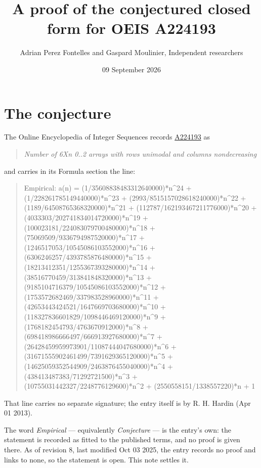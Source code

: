\documentclass[11pt]{article}
\title{A proof of the conjectured closed form for OEIS A224193}
\author{Adrian Perez Fontelles and Gaspard Moulinier, Independent researchers}
\date{09 September 2026}
\theoremstyle{definition}
\begin{document}
\maketitle
\section{The conjecture}

The Online Encyclopedia of Integer Sequences records \href{https://oeis.org/A224193}{A224193} as

\begin{quote}\itshape Number of 6Xn 0..2 arrays with rows unimodal and columns nondecreasing\end{quote}

and carries in its Formula section the line:

\begin{quote}\ttfamily Empirical: a(n) = (1/35608838483312640000)*n\textasciicircum{}24 + (1/228261785149440000)*n\textasciicircum{}23 + (2993/8515157028618240000)*n\textasciicircum{}22 + (1189/64508765368320000)*n\textasciicircum{}21 + (112787/162193467211776000)*n\textasciicircum{}20 + (4033303/202741834014720000)*n\textasciicircum{}19 + (100023181/224083079700480000)*n\textasciicircum{}18 + (75069509/9336794987520000)*n\textasciicircum{}17 + (1246517053/10545086103552000)*n\textasciicircum{}16 + (6306246257/4393785876480000)*n\textasciicircum{}15 + (18213412351/1255367393280000)*n\textasciicircum{}14 + (38516770459/313841848320000)*n\textasciicircum{}13 + (9185104716379/10545086103552000)*n\textasciicircum{}12 + (1753572682469/337983528960000)*n\textasciicircum{}11 + (42653443424521/1647669703680000)*n\textasciicircum{}10 + (118327836601829/1098446469120000)*n\textasciicircum{}9 + (1768182454793/4763670912000)*n\textasciicircum{}8 + (698418986666497/666913927680000)*n\textasciicircum{}7 + (26428459959973901/11087444047680000)*n\textasciicircum{}6 + (31671555902461499/7391629365120000)*n\textasciicircum{}5 + (14625059352544909/2463876455040000)*n\textasciicircum{}4 + (438413487383/71292721500)*n\textasciicircum{}3 + (10755031442327/2248776129600)*n\textasciicircum{}2 + (2550558151/1338557220)*n + 1\end{quote}

That line carries no separate signature; the entry itself is by R. H. Hardin (Apr 01 2013).

The word {\itshape Empirical} --- equivalently {\itshape Conjecture} --- is the entry's own: the statement is recorded as fitted to the published terms, and no proof is given there. As of revision 8, last modified Oct 03 2025, the entry records no proof and links to none, so the statement is open. This note settles it.
\end{document}
